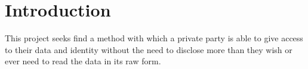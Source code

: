 \section{Introduction}


This project seeks find a method with which a private party is able to give access to their data and identity without the need to disclose more than they wish or ever need to read the data in its raw form.
